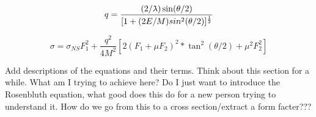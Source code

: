 \documentclass[12pt]{article}
\begin{document}
\newcommand{\lambdabar}{{\mkern0.75mu\mathchar '26\mkern -9.75mu\lambda}}

\begin{equation}
    q = \frac{(2/\lambdabar)\sin(\theta/2)}{[1+(2E/M)sin^2(\theta/2)]^\frac{1}{2}}
\end{equation}

\begin{equation}\label{Rosenbluth1950}
    \sigma = \sigma_{NS}{F_1^2 + \frac{q^2}{4M^2}[2(F_1+\mu{F_2})^2*\tan^2(\theta/2)+\mu^2F_2^2]}
\end{equation}

Add descriptions of the equations and their terms. Think about this section for a while. What am I trying to achieve here? Do I just want to introduce the Rosenbluth equation, what good does this do for a new person trying to understand it. How do we go from this to a cross section/extract a form facter???






\end{document}
